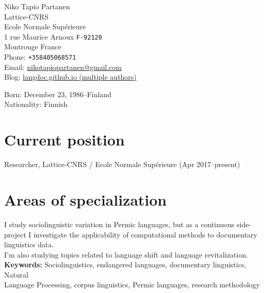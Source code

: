 \documentclass[11pt, a4paper]{article}
\begin{document}

{\LARGE Niko Tapio Partanen}\\[1cm] %
Lattice-CNRS\\ %
Ecole Normale Supérieure\\
1 rue Maurice Arnoux \texttt{F-92120}\\
Montrouge France\\[.2cm]
Phone: \texttt{+358405068571}\\ %
Email: \href{mailto:nikotapiopartanen@gmail.com}{nikotapiopartanen@gmail.com}\\ %
Blog: \href{http://langdoc.github.io}{langdoc.github.io (multiple authors)}\\ %

\vfill %


Born: December 23, 1986–Finland\\ %
Nationality: Finnish %


\section*{Current position}

Researcher, Lattice-CNRS / Ecole Normale Supérieure (Apr 2017–present)%

\section*{Areas of specialization}

I study sociolinguistic variation in Permic languages, but as a continuous side-project I investigate the applicability of computational methods to documentary linguistics data.\\
I'm also studying topics related to language shift and language revitalization.\\

\textbf{Keywords:} Sociolinguistics, endangered languages, documentary linguistics, Natural\\ Language Processing, corpus linguistics, Permic languages, research methodology %
\end{document}
